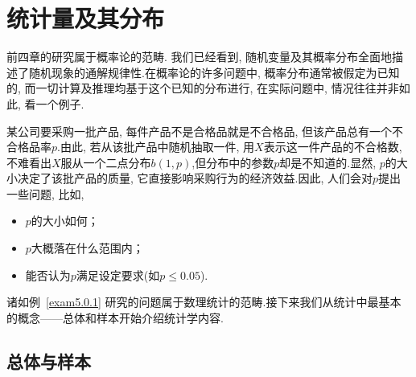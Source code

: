 \chapter{统计量及其分布\label{cha:5}}
前四章的研究属于概率论的范畴. 我们已经看到, 随机变量及其概率分布全面地描述了随机现象的通解规律性.在概率论的许多问题中, 概率分布通常被假定为已知的, 而一切计算及推理均基于这个已知的分布进行, 在实际问题中, 情况往往并非如此, 看一个例子.
\begin{example}\label{exam5.0.1}
某公司要采购一批产品, 每件产品不是合格品就是不合格品, 但该产品总有一个不合格品率$p$.由此, 若从该批产品中随机抽取一件, 用$X$表示这一件产品的不合格数, 不难看出$X$服从一个二点分布$b(1,p)$,但分布中的参数$p$却是不知道的.显然,  $p$的大小决定了该批产品的质量, 它直接影响采购行为的经济效益.因此, 人们会对$p$提出一些问题, 比如,
\begin{itemize}
\item $p$的大小如何；
\item $p$大概落在什么范围内；
\item 能否认为$p$满足设定要求(如$p\leq0.05$).
\end{itemize}
\end{example}
诸如例~\ref{exam5.0.1} 研究的问题属于数理统计的范畴.接下来我们从统计中最基本的概念——总体和样本开始介绍统计学内容.
\section{总体与样本\label{sec:8.1}}
